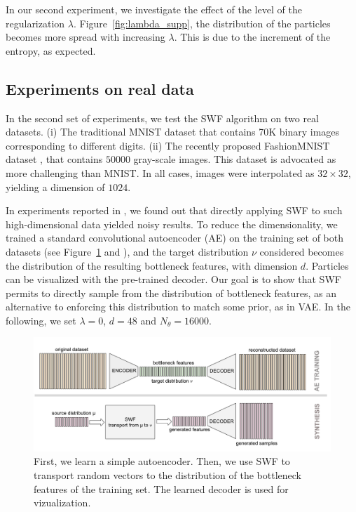 

In our second experiment, we investigate the effect of the level of the regularization $\lambda$. Figure~\ref{fig:lambda_supp}, the distribution of the particles becomes more spread with increasing $\lambda$. This is due to the increment of the entropy, as expected.

\subsection{Experiments on real data}

In the second set of experiments, we test the SWF algorithm on two real datasets. (i) The traditional MNIST dataset that contains 70K binary images corresponding to different digits. (ii) The recently proposed FashionMNIST dataset \cite{xiao2017fashion}, that contains $50000$ gray-scale images. This dataset is advocated as more challenging than MNIST. In all cases, images were interpolated as $32\times 32$, yielding a dimension of $1024$.

In experiments reported in \supp, we found out that directly applying SWF to such high-dimensional data yielded noisy results. To reduce the dimensionality, we trained a standard convolutional autoencoder (AE) on the training set of both datasets (see Figure~\ref{fig:using_ae} and \supp), and the target distribution $\nu$ considered becomes the distribution of the resulting bottleneck features,
with dimension $d$. Particles can be visualized with the pre-trained decoder.
Our goal is to show that SWF permits to directly sample from the distribution of bottleneck features, as an alternative to enforcing this distribution to match some prior, as in VAE. In the following, we set $\lambda=0$, $d=48$ and $N_\theta=16000$.

\begin{figure}
\centering
\includegraphics[width=0.99\columnwidth]{figures/generating_bottleneck_features.pdf}
\caption{First, we learn a simple autoencoder. Then, we use SWF to transport random vectors to the distribution of the bottleneck features of the training set. The learned decoder is used for vizualization.}
\label{fig:using_ae}
\vspace{-10pt}
\end{figure}


